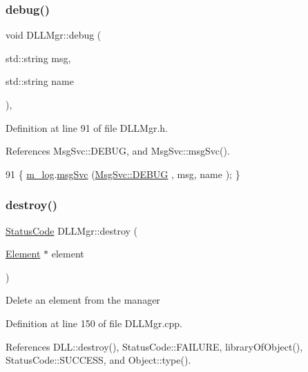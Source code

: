\subsubsection{\texorpdfstring{debug()}{debug()}\hspace{0.1cm}{\footnotesize\ttfamily [2/2]}}
{\footnotesize\ttfamily void D\+L\+L\+Mgr\+::debug (\begin{DoxyParamCaption}\item[{std\+::string}]{msg,  }\item[{std\+::string}]{name }\end{DoxyParamCaption})\hspace{0.3cm}{\ttfamily [inline]}, {\ttfamily [private]}}



Definition at line 91 of file D\+L\+L\+Mgr.\+h.



References Msg\+Svc\+::\+D\+E\+B\+UG, and Msg\+Svc\+::msg\+Svc().


\begin{DoxyCode}
91 \{ \hyperlink{classDLLMgr_a64b523faed64378451ee76f6fbf0800d}{m\_log}.\hyperlink{classMsgSvc_ad25f18047920cc59a314e5098259711c}{msgSvc} (\hyperlink{classMsgSvc_ae671eb7301996cd049d2da8a65925926a1dbdcc82dce88370ec335883c83b38b0}{MsgSvc::DEBUG}   , msg, name ); \}
\end{DoxyCode}
\mbox{\label{classDLLMgr_abc9c97bab16c8f261626ed401d67c8c8}} 
\subsubsection{\texorpdfstring{destroy()}{destroy()}\hspace{0.1cm}{\footnotesize\ttfamily [1/2]}}
{\footnotesize\ttfamily \hyperlink{classStatusCode}{Status\+Code} D\+L\+L\+Mgr\+::destroy (\begin{DoxyParamCaption}\item[{\hyperlink{classElement}{Element} $\ast$}]{element }\end{DoxyParamCaption})}

Delete an element from the manager 

Definition at line 150 of file D\+L\+L\+Mgr.\+cpp.



References D\+L\+L\+::destroy(), Status\+Code\+::\+F\+A\+I\+L\+U\+RE, library\+Of\+Object(), Status\+Code\+::\+S\+U\+C\+C\+E\+SS, and Object\+::type().



